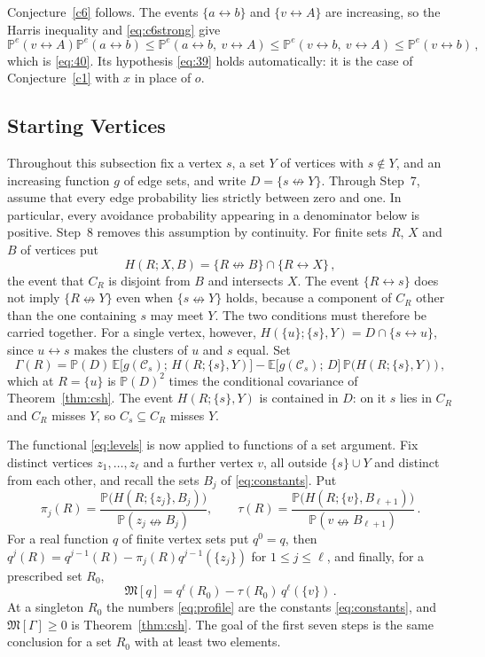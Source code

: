 \documentclass[11pt]{article}
\theoremstyle{definition}
\theoremstyle{remark}
\newcommand{\PP}{\mathbb P}
\newcommand{\EE}{\mathbb E}
\newcommand{\con}{\leftrightarrow}
\newcommand{\ncon}{\nleftrightarrow}
\newcommand{\eC}{\mathcal C}
\newcommand{\Marg}{\mathfrak M}
\begin{document}
Conjecture~\ref{c6} follows. The events $\{a\con b\}$ and $\{v\con A\}$ are increasing, so
the Harris inequality and \eqref{eq:c6strong} give
\[
 \PP^e(v\con A)\PP^e(a\con b)\leq \PP^e(a\con b,\ v\con A)\leq
 \PP^e(v\con b,\ v\con A)\leq \PP^e(v\con b)\,,
\]
which is \eqref{eq:40}. Its hypothesis \eqref{eq:39} holds automatically: it is the case of
Conjecture~\ref{c1} with $x$ in place of $o$.

\subsection{Starting Vertices}\label{ss:chain}

Throughout this subsection fix a vertex $s$, a set $Y$ of vertices with $s\notin Y$, and an
increasing function $g$ of edge sets, and write $D=\{s\ncon Y\}$. Through Step~7, assume
that every edge probability lies strictly between zero and one. In particular, every
avoidance probability appearing in a denominator below is positive. Step~8 removes this
assumption by continuity. For finite sets $R$,
$X$ and $B$ of vertices put
\begin{equation}\label{eq:guardev}
 H(R;X,B)=\{R\ncon B\}\cap\{R\con X\}\,,
\end{equation}
the event that $C_R$ is disjoint from $B$ and intersects $X$. The event $\{R\con s\}$ does not imply
$\{R\ncon Y\}$ even when $\{s\ncon Y\}$ holds, because a component of $C_R$ other than the
one containing $s$ may meet $Y$. The two conditions must therefore be carried together. For
a single vertex, however, $H(\{u\};\{s\},Y)=D\cap\{s\con u\}$, since $u\con s$ makes the
clusters of $u$ and $s$ equal. Set
\begin{equation}\label{eq:gamma}
 \Gamma(R)=\PP(D)\,\EE\bigl[g(\eC_s);\,H(R;\{s\},Y)\bigr]
 -\EE\bigl[g(\eC_s);\,D\bigr]\,\PP\bigl(H(R;\{s\},Y)\bigr)\,,
\end{equation}
which at $R=\{u\}$ is $\PP(D)^2$ times the conditional covariance of
Theorem~\ref{thm:csh}. The event $H(R;\{s\},Y)$ is contained in $D$: on it $s$ lies in
$C_R$ and $C_R$ misses $Y$, so $C_s\subseteq C_R$ misses $Y$.

The functional \eqref{eq:levels} is now applied to functions of a set argument. Fix
distinct vertices $z_1,\dots,z_\ell$ and a further vertex $v$, all outside $\{s\}\cup Y$
and distinct from each other, and recall the sets $B_j$ of \eqref{eq:constants}. Put
\begin{equation}\label{eq:profile}
 \pi_j(R)=\frac{\PP\bigl(H(R;\{z_j\},B_j)\bigr)}{\PP(z_j\ncon B_j)},\qquad
 \tau(R)=\frac{\PP\bigl(H(R;\{v\},B_{\ell+1})\bigr)}{\PP(v\ncon B_{\ell+1})}\,.
\end{equation}
For a real function $q$ of finite vertex sets put $q^0=q$, then
$q^j(R)=q^{j-1}(R)-\pi_j(R)q^{j-1}(\{z_j\})$ for $1\le j\le\ell$, and finally, for a
prescribed set $R_0$,
\begin{equation}\label{eq:margin}
 \Marg[q]=q^\ell(R_0)-\tau(R_0)\,q^\ell(\{v\})\,.
\end{equation}
At a singleton $R_0$ the numbers \eqref{eq:profile} are the constants
\eqref{eq:constants}, and $\Marg[\Gamma]\ge0$ is Theorem~\ref{thm:csh}. The goal of the
first seven steps is the same conclusion for a set $R_0$ with at least two elements.
\end{document}
